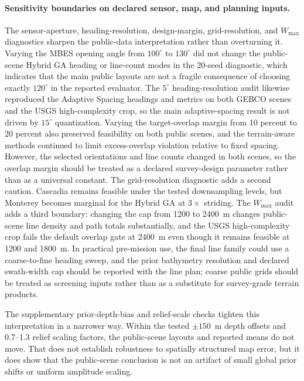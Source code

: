 \documentclass[jmse,article,submit,moreauthors]{Definitions/mdpi}
\begin{document}
\paragraph{Sensitivity boundaries on declared sensor, map, and planning inputs.}
The sensor-aperture, heading-resolution, design-margin, grid-resolution, and \(W_{\max}\) diagnostics sharpen the public-data interpretation rather than overturning it. Varying the MBES opening angle from \(100^{\circ}\) to \(130^{\circ}\) did not change the public-scene Hybrid GA heading or line-count modes in the 20-seed diagnostic, which indicates that the main public layouts are not a fragile consequence of choosing exactly \(120^{\circ}\) in the reported evaluator. The \(5^{\circ}\) heading-resolution audit likewise reproduced the Adaptive Spacing headings and metrics on both GEBCO scenes and the USGS high-complexity crop, so the main adaptive-spacing result is not driven by \(15^{\circ}\) quantization. Varying the target-overlap margin from 10 percent to 20 percent also preserved feasibility on both public scenes, and the terrain-aware methods continued to limit excess-overlap violation relative to fixed spacing. However, the selected orientations and line counts changed in both scenes, so the overlap margin should be treated as a declared survey-design parameter rather than as a universal constant. The grid-resolution diagnostic adds a second caution. Cascadia remains feasible under the tested downsampling levels, but Monterey becomes marginal for the Hybrid GA at \(3\times\) striding. The \(W_{\max}\) audit adds a third boundary: changing the cap from 1200 to 2400~m changes public-scene line density and path totals substantially, and the USGS high-complexity crop fails the default overlap gate at 2400~m even though it remains feasible at 1200 and 1800~m. In practical pre-mission use, the final line family could use a coarse-to-fine heading sweep, and the prior bathymetry resolution and declared swath-width cap should be reported with the line plan; coarse public grids should be treated as screening inputs rather than as a substitute for survey-grade terrain products.

The supplementary prior-depth-bias and relief-scale checks tighten this interpretation in a narrower way. Within the tested \(\pm 150\)~m depth offsets and 0.7--1.3 relief scaling factors, the public-scene layouts and reported means do not move. That does not establish robustness to spatially structured map error, but it does show that the public-scene conclusion is not an artifact of small global prior shifts or uniform amplitude scaling.
\end{document}
